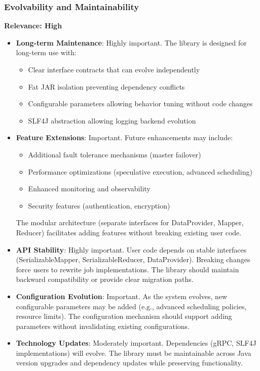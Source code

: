 \documentclass{scrartcl}
\begin{document}
\subsubsection{Evolvability and Maintainability}

\textbf{Relevance: High}

\begin{itemize}
    \item \textbf{Long-term Maintenance}: Highly important. The library is designed for long-term use with:
          \begin{itemize}
              \item Clear interface contracts that can evolve independently
              \item Fat JAR isolation preventing dependency conflicts
              \item Configurable parameters allowing behavior tuning without code changes
              \item SLF4J abstraction allowing logging backend evolution
          \end{itemize}

    \item \textbf{Feature Extensions}: Important. Future enhancements may include:
          \begin{itemize}
              \item Additional fault tolerance mechanisms (master failover)
              \item Performance optimizations (speculative execution, advanced scheduling)
              \item Enhanced monitoring and observability
              \item Security features (authentication, encryption)
          \end{itemize}
          The modular architecture (separate interfaces for DataProvider, Mapper, Reducer) facilitates adding features without breaking existing user code.

    \item \textbf{API Stability}: Highly important. User code depends on stable interfaces (SerializableMapper, SerializableReducer, DataProvider). Breaking changes force users to rewrite job implementations. The library should maintain backward compatibility or provide clear migration paths.

    \item \textbf{Configuration Evolution}: Important. As the system evolves, new configurable parameters may be added (e.g., advanced scheduling policies, resource limits). The configuration mechanism should support adding parameters without invalidating existing configurations.

    \item \textbf{Technology Updates}: Moderately important. Dependencies (gRPC, SLF4J implementations) will evolve. The library must be maintainable across Java version upgrades and dependency updates while preserving functionality.
\end{itemize}
\end{document}
